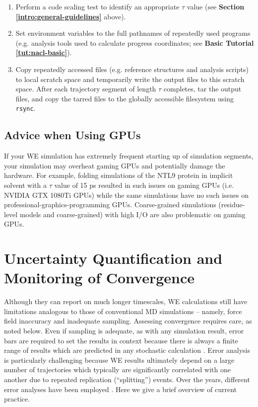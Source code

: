 \begin{enumerate}
\item Perform a code scaling test to identify an appropriate $\tau$ value (see \textbf{Section \ref{intro:general-guidelines}} above). 
\item Set environment variables to the full pathnames of repeatedly used programs (e.g. analysis tools used to calculate progress coordinates; see \textbf{Basic Tutorial \ref{tut:nacl-basic}}).  
\item Copy repeatedly accessed files (e.g. reference structures and analysis scripts) to local scratch space and temporarily write the output files to this scratch space. 
After each trajectory segment of length $\tau$ completes, tar the output files, and copy the tarred files to the globally accessible filesystem using \verb|rsync|. 
\end{enumerate}

\subsection{Advice when Using GPUs}

If your WE simulation has extremely frequent starting up of simulation segments, your simulation may overheat gaming GPUs and potentially damage the hardware. 
For example, folding simulations of the NTL9 protein in implicit solvent with a $\tau$ value of 15 ps resulted in such issues on gaming GPUs (i.e. NVIDIA GTX 1080Ti GPUs) while the same simulations have no such issues on professional-graphics-programming GPUs. 
Coarse-grained simulations (residue-level models and coarse-grained) with high I/O are also problematic on gaming GPUs. 

\section{Uncertainty Quantification and Monitoring of Convergence}

Although they can report on much longer timescales, WE calculations still have limitations analogous to those of conventional MD simulations -- namely, force field inaccuracy and inadequate sampling. 
Assessing convergence requires care, as noted below. 
Even if sampling is adequate, as with any simulation result, error bars are required to set the results in context because there is always a finite range of results which are predicted in any stochastic calculation \citep{Grossfield2019}. 
Error analysis is particularly challenging because WE results ultimately depend on a large number of trajectories which typically are significantly correlated with one another due to repeated replication (“splitting”) events. 
Over the years, different error analyses have been employed \citep{Zhang2007,Zwier2016,Mostofian2019}. 
Here we give a brief overview of current practice.

